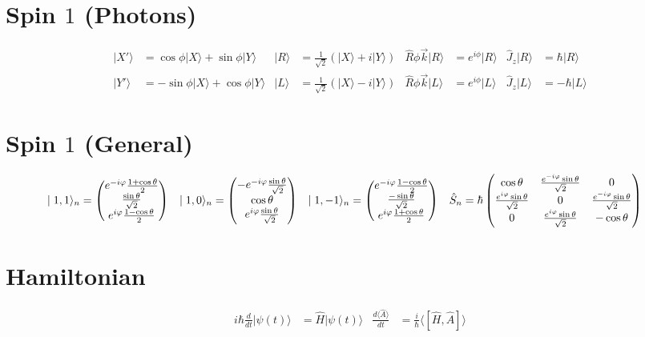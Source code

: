 \documentclass{article}
\newcommand{\mysection}[1]{\vspace{-2em}
\section*{#1}
\vspace{-2em}}
\newcommand{\ket}[1]{\ensuremath{\mid#1\rangle}}
\newcommand{\expect}[1]{\ensuremath{\langle#1\rangle}}
\newcommand{\op}[1]{\ensuremath{\hat#1}}
\newcommand{\mat}[1]{\ensuremath{\begin{pmatrix}\ensuremath{#1}\end{pmatrix}}}
\begin{document}
	\mysection{Spin $1$ (Photons)}
	\begin{align*}
		\ket{X'}&=\cos\phi\ket{X}+\sin\phi\ket{Y} &
		\ket{R}&=\frac{1}{\sqrt{2}}(\ket{X}+i\ket{Y}) &
		\op{R\phi\vec{k}}\ket{R}&=e^{i\phi}\ket{R} &
		\op{J_z}\ket{R}&=\hbar\ket{R} \\
		\ket{Y'}&=-\sin\phi\ket{X}+\cos\phi\ket{Y} &
		\ket{L}&=\frac{1}{\sqrt{2}}(\ket{X}-i\ket{Y}) &
		\op{R\phi\vec{k}}\ket{L}&=e^{i\phi}\ket{L} &
		\op{J_z}\ket{L}&=-\hbar\ket{L}
	\end{align*}
	\mysection{Spin $1$ (General)}
	\begin{align*}
		\ket{1,1}_n&=\mat{e^{-i\varphi}\frac{1+\cos\theta}{2}\\
			\frac{\sin\theta}{\sqrt2}\\
			e^{i\varphi}\frac{1-\cos\theta}{2}} &
		\ket{1,0}_n&=\mat{-e^{-i\varphi}\frac{\sin\theta}{\sqrt2}\\
			\cos\theta\\e^{i\varphi}\frac{\sin\theta}{\sqrt2}} &
		\ket{1,-1}_n&=\mat{e^{-i\varphi}\frac{1-\cos\theta}{2}\\
			\frac{-\sin\theta}{\sqrt2}\\
			e^{i\varphi}\frac{1+\cos\theta}{2}} &
		\op{S_n}&=\hbar\mat{
			\cos\theta&\frac{e^{-i\varphi}\sin\theta}{\sqrt2}&0\\
			\frac{e^{i\varphi}\sin\theta}{\sqrt{2}}&0&
				\frac{e^{-i\varphi}\sin\theta}{\sqrt2}\\
			0&\frac{e^{i\varphi}\sin\theta}{\sqrt2}&-\cos\theta}
	\end{align*}
	\mysection{Hamiltonian}
	\begin{align*}
		i\hbar\frac{d}{dt}\ket{\psi(t)}&=\op{H}\ket{\psi(t)} &
		\frac{d\expect{\op{A}}}{dt}&=\frac{i}{\hbar}\expect{[\op{H},\op{A}]}
	\end{align*}
\end{document}
